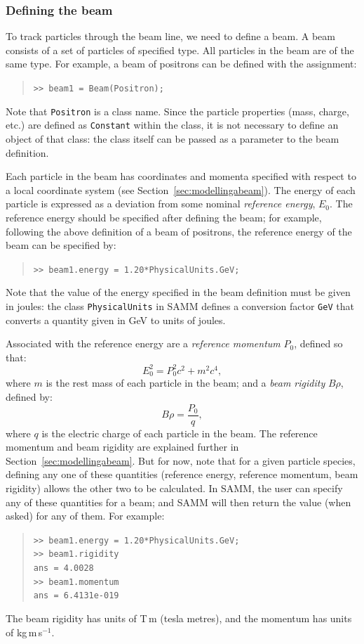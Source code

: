 \documentclass[11pt,twoside,a4paper]{article}
\begin{document}
\subsubsection{Defining the beam}
To track particles through the beam line, we need to define a beam.  A beam
consists of a set of particles of specified type.  All particles in the beam
are of the same type.  For example, a beam of positrons can be defined with
the assignment:
\begin{quote}
\texttt{>> beam1 = Beam(Positron);}
\end{quote}
Note that
\texttt{Positron} is a class name.  Since the particle properties (mass, charge,
etc.) are defined as \texttt{Constant} within the class, it is not necessary
to define an object of that class: the class itself can be passed as a parameter
to the beam definition.

Each particle in the beam has coordinates and momenta specified with respect
to a local coordinate system (see Section~\ref{sec:modellingabeam}).  The energy
of each particle is expressed as a deviation from some nominal \emph{reference
energy}, $E_0$.  The reference energy should be specified after defining the beam;
for example, following the above definition of a beam of positrons, the reference
energy of the beam can be specified by:
\begin{quote}
\texttt{>> beam1.energy = 1.20*PhysicalUnits.GeV;}
\end{quote}
Note that the value
of the energy specified in the beam definition must be given in joules: the class
\texttt{PhysicalUnits} in SAMM defines a conversion factor \texttt{GeV} that
converts a quantity given in GeV to units of joules.

Associated with the reference energy are a \emph{reference momentum} $P_0$,
defined so that:
\[
E_0^2 = P_0^2 c^2 + m^2 c^4,
\]
where $m$ is the rest mass of each particle in the beam; and a \emph{beam
rigidity} $B\rho$, defined by:
\[
B\rho = \frac{P_0}{q},
\]
where $q$ is the electric charge of each particle in the beam.  The reference
momentum and beam rigidity are explained further in Section~\ref{sec:modellingabeam}.
But for now, note that for a given particle species, defining any one of these quantities
(reference energy, reference momentum, beam rigidity) allows the other two to be
calculated.  In SAMM, the user can specify any of these quantities for a beam; and SAMM
will then return the value (when asked) for any of them.  For example:
\begin{quote}
\texttt{>> beam1.energy = 1.20*PhysicalUnits.GeV; \\
>> beam1.rigidity \\
ans = 4.0028 \\
>> beam1.momentum \\
ans = 6.4131e-019
}
\end{quote}
The beam rigidity has units of T\,m (tesla metres), and the momentum
has units of kg\,m\,s$^{-1}$.
\end{document}
